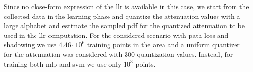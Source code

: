 \documentclass[draftcls,onecolumn,12pt]{IEEEtran}
\begin{document}

Since no close-form expression of the \ac{llr} is available in this case, we start from the collected data in the learning phase and quantize the attenuation values with a large alphabet and estimate the sampled \ac{pdf} for the quantized attenuation to be used in the \ac{llr} computation. For the considered scenario with path-loss and shadowing we use $4.46 \cdot 10^6$ training points in the area and a uniform quantizer for the attenuation was considered with $300$ quantization values. Instead, for training both \ac{mlp} and \ac{svm} we use only $10^3$ points. 
\end{document}
